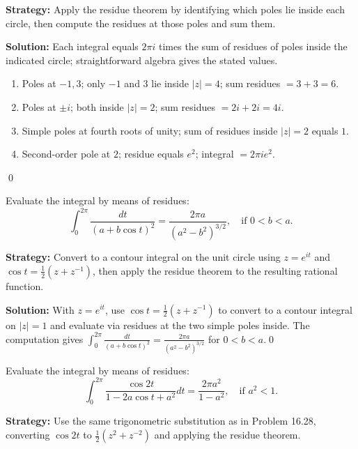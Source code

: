 \noindent\textbf{Strategy:} Apply the residue theorem by identifying which poles lie inside each circle, then compute the residues at those poles and sum them.

\bigskip\noindent\textbf{Solution:}
Each integral equals $2\pi i$ times the sum of residues of poles inside the indicated circle; straightforward algebra gives the stated values.
\begin{enumerate}[label=(\alph*)]
\item Poles at $-1,3$; only $-1$ and $3$ lie inside $|z|=4$; sum residues $=3+3=6$.
\item Poles at $\pm i$; both inside $|z|=2$; sum residues $=2i+2i=4i$.
\item Simple poles at fourth roots of unity; sum of residues inside $|z|=2$ equals $1$.
\item Second-order pole at $2$; residue equals $e^2$; integral $=2\pi i e^2$.
\end{enumerate}\qed


\begin{problembox}
\begin{problemstatement}
Evaluate the integral by means of residues:
\[ \int_0^{2\pi} \frac{dt}{(a + b \cos t)^2} = \frac{2\pi a}{(a^2 - b^2)^{3/2}}, \quad \text{if } 0 < b < a. \]
\end{problemstatement}
\end{problembox}

\noindent\textbf{Strategy:} Convert to a contour integral on the unit circle using \( z = e^{it} \) and \( \cos t = \frac{1}{2}(z + z^{-1}) \), then apply the residue theorem to the resulting rational function.

\bigskip\noindent\textbf{Solution:}
With $z=e^{it}$, use $\cos t=\tfrac12(z+z^{-1})$ to convert to a contour integral on $|z|=1$ and evaluate via residues at the two simple poles inside. The computation gives $\int_0^{2\pi}\frac{dt}{(a+b\cos t)^2}=\frac{2\pi a}{(a^2-b^2)^{3/2}}$ for $0<b<a$.\qed


\begin{problembox}
\begin{problemstatement}
Evaluate the integral by means of residues:
\[ \int_0^{2\pi} \frac{\cos 2t}{1 - 2a \cos t + a^2} dt = \frac{2\pi a^2}{1 - a^2}, \quad \text{if } a^2 < 1. \]
\end{problemstatement}
\end{problembox}

\noindent\textbf{Strategy:} Use the same trigonometric substitution as in Problem 16.28, converting \( \cos 2t \) to \( \frac{1}{2}(z^2 + z^{-2}) \) and applying the residue theorem.

